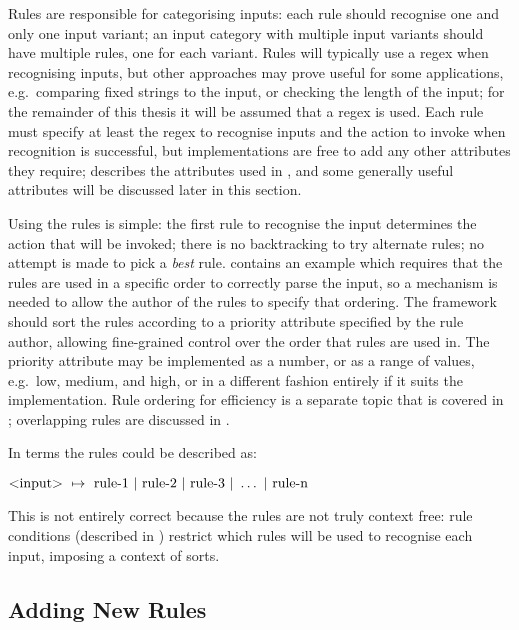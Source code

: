 \label{rules in architecture}

Rules are responsible for categorising inputs: each rule should recognise
one and only one input variant; an input category with multiple input
variants should have multiple rules, one for each variant.  Rules will
typically use a regex when recognising inputs, but other approaches may
prove useful for some applications, e.g.\ comparing fixed strings to the
input, or checking the length of the input; for the remainder of this
thesis it will be assumed that a regex is used.  Each rule must specify at
least the regex to recognise inputs and the action to invoke when
recognition is successful, but implementations are free to add any other
attributes they require;  describes the attributes
used in \parsername{}, and some generally useful attributes will be
discussed later in this section.

Using the rules is simple: the first rule to recognise the input determines
the action that will be invoked; there is no backtracking to try alternate
rules; no attempt is made to pick a \textit{best\/} rule.
 contains an example which
requires that the rules are used in a specific order to correctly parse the
input, so a mechanism is needed to allow the author of the rules to specify
that ordering.  The framework should sort the rules according to a priority
attribute specified by the rule author, allowing fine-grained control over
the order that rules are used in.  The priority attribute may be
implemented as a number, or as a range of values, e.g.\ low, medium, and
high, or in a different fashion entirely if it suits the implementation.
Rule ordering for efficiency is a separate topic that is covered in
; overlapping rules are discussed
in .

In  terms the rules could be described as:

\tab{}$\text{\textless{}input\textgreater{}}~\mapsto{}~\text{rule-1}~|~\text{rule-2}~|~\text{rule-3}~|~\dots~|~\text{rule-n}$

This is not entirely correct because the rules are not truly context free:
rule conditions (described in )
restrict which rules will be used to recognise each input, imposing a
context of sorts.

\subsection{Adding New Rules}


